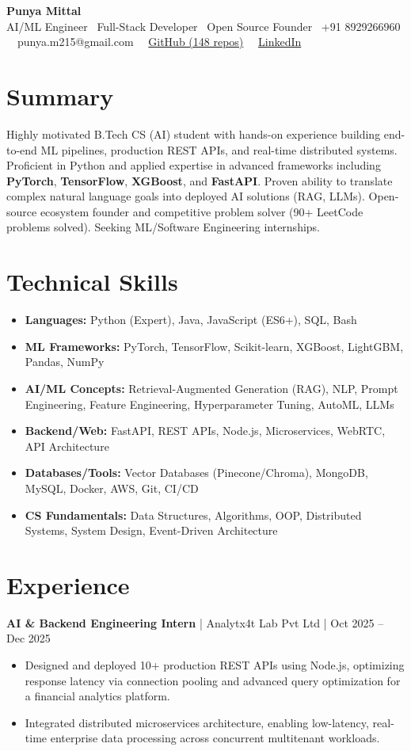 \documentclass[10pt, letterpaper]{article}
\makeatletter
\newcommand{\headerinfo}{
    \begin{center}
        \textbf{\Huge Punya Mittal} \\
        \vspace{2pt}
        \small AI/ML Engineer \textperiodcentered\ Full-Stack Developer \textperiodcentered\ Open Source Founder
        \vspace{4pt}
        \small \faPhone\ +91 8929266960 \textperiodcentered\ \faEnvelope\ punya.m215@gmail.com \textperiodcentered\ \faGithub\ \href{https://github.com/yourusername}{GitHub (148 repos)} \textperiodcentered\ \faLinkedin\ \href{https://linkedin.com/in/yourprofile}{LinkedIn}
    \end{center}
    \vspace{6pt}
}
\makeatother
\begin{document}
\headerinfo

\section*{Summary}
Highly motivated B.Tech CS (AI) student with hands-on experience building end-to-end ML pipelines, production REST APIs, and real-time distributed systems. Proficient in Python and applied expertise in advanced frameworks including \textbf{PyTorch}, \textbf{TensorFlow}, \textbf{XGBoost}, and \textbf{FastAPI}. Proven ability to translate complex natural language goals into deployed AI solutions (RAG, LLMs). Open-source ecosystem founder and competitive problem solver (90+ LeetCode problems solved). Seeking ML/Software Engineering internships.

\section*{Technical Skills}
\begin{itemize}
    \item \textbf{Languages:} Python (Expert), Java, JavaScript (ES6+), SQL, Bash
    \item \textbf{ML Frameworks:} PyTorch, TensorFlow, Scikit-learn, XGBoost, LightGBM, Pandas, NumPy
    \item \textbf{AI/ML Concepts:} Retrieval-Augmented Generation (RAG), NLP, Prompt Engineering, Feature Engineering, Hyperparameter Tuning, AutoML, LLMs
    \item \textbf{Backend/Web:} FastAPI, REST APIs, Node.js, Microservices, WebRTC, API Architecture
    \item \textbf{Databases/Tools:} Vector Databases (Pinecone/Chroma), MongoDB, MySQL, Docker, AWS, Git, CI/CD
    \item \textbf{CS Fundamentals:} Data Structures, Algorithms, OOP, Distributed Systems, System Design, Event-Driven Architecture
\end{itemize}

\section*{Experience}
\textbf{AI & Backend Engineering Intern} | Analytx4t Lab Pvt Ltd | Oct 2025 – Dec 2025
\begin{itemize}
    \item Designed and deployed 10+ production REST APIs using Node.js, optimizing response latency via connection pooling and advanced query optimization for a financial analytics platform.
    \item Integrated distributed microservices architecture, enabling low-latency, real-time enterprise data processing across concurrent multitenant workloads.
\end{itemize}
\end{document}
